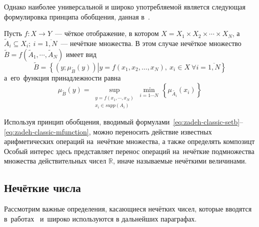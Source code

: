 Однако наиболее универсальной и широко употребляемой является следующая формулировка принципа обобщения, данная в~\cite{Rutkovskaya, Yakhyaeva}. 
\begin{mydef}
Пусть $f:X\to Y$~--- чёткое отображение, в котором $X=X_1 \times X_2 \times \cdots \times X_N$, а $\tilde A_i \subseteq X_i;\ i=\overline{1,N}$~--- нечёткие множества. В этом случае нечёткое множество $\tilde{B}=f\left( {{{\tilde{A}}}_{1}},\cdots,{{{\tilde{A}}}_{N}} \right)$ имеет вид
\begin{equation}
\label{eq:zadeh-classic-setb}
	\tilde{B}=\left\{ \left( y; \mu_{\tilde B} \left( y \right) \right)\left| y=f\left( x_1, x_2, \dots, x_N \right),\ x_i \in X\ \forall i=\overline{1,N} \right. \right\}
\end{equation}
а~его~функция принадлежности равна
\begin{equation}
\label{eq:zadeh-classic-mfunction}
	\mu_{\tilde B} \left( y \right)=\underset{
		\begin{smallmatrix} 
			 y=f\left( x_1, \cdots, x_N \right) \\ 
			 {{x}_{i}}\in supp\left( {{A}_{i}} \right) 
		\end{smallmatrix}}
	{\mathop{\sup }} {} \underset{i=1\cdots N}{\mathop{\min }} {}\, 
	\left\{ \mu_{\tilde {A_i}} \left( x_i \right ) \right \}
\end{equation}
\end{mydef}
Используя принцип обобщения, вводимый формулами~\eqref{eq:zadeh-classic-setb}--\eqref{eq:zadeh-classic-mfunction}, можно переносить действие известных арифметических операций на~нечёткие множества, а также определять композицт Особый интерес здесь представляет перенос операций на~нечёткие подмножества множества действительных чисел $\mathbb{R}$, иначе называемые нечёткими величинами.

\subsection{Нечёткие числа}

Рассмотрим важные определения, касающиеся нечётких чисел, которые вводятся в~работах~\cite{Rutkovskaya, Pegat, Borisov_Alexeev_Msk, Pospelov} и~широко используются в дальнейших параграфах.

